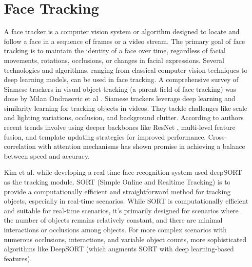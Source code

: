 \section{Face Tracking} \label{section:ft}
A face tracker is a computer vision system or algorithm designed to locate and follow a face in a sequence of frames or a video stream. The primary goal of face tracking is to maintain the identity of a face over time, regardless of facial movements, rotations, occlusions, or changes in facial expressions. Several technologies and algorithms, ranging from classical computer vision techniques to deep learning models, can be used in face tracking. A comprehensive survey of Siamese trackers in visual object tracking (a parent field of face tracking) was done by Milan Ondrasovic et al \cite{ondrasovic_siamese_2021}. Siamese trackers leverage deep learning and similarity learning for tracking objects in videos. They tackle challenges like scale and lighting variations, occlusion, and background clutter. According to authors recent trends involve using deeper backbones like ResNet \cite{aziz_exploring_2020}, multi-level feature fusion, and template updating strategies for improved performance. Cross-correlation with attention mechanisms has shown promise in achieving a balance between speed and accuracy.

Kim et al. \cite{kim_facial_2023} while developing a real time face recognition system used deepSORT as the tracking module. SORT (Simple Online and Realtime Tracking) is to provide a computationally efficient and straightforward method for tracking objects, especially in real-time scenarios. While SORT is computationally efficient and suitable for real-time scenarios, it's primarily designed for scenarios where the number of objects remains relatively constant, and there are minimal interactions or occlusions among objects. For more complex scenarios with numerous occlusions, interactions, and variable object counts, more sophisticated algorithms like DeepSORT (which augments SORT with deep learning-based features).

